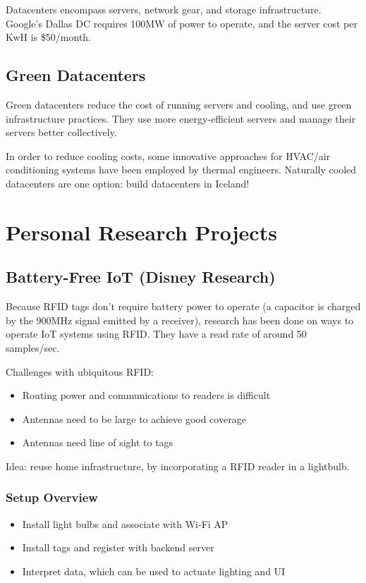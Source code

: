 \documentclass[twoside]{article}
\begin{document}
Datacenters encompass servers, network gear, and storage infrastructure. Google's Dallas DC requires 100MW of power to operate, and the server cost per KwH is \$50/month.

\subsection{Green Datacenters}
Green datacenters reduce the cost of running servers and cooling, and use green infrastructure practices. They use more energy-efficient servers and manage their servers better collectively. 

In order to reduce cooling costs, some innovative approaches for HVAC/air conditioning systems have been employed by thermal engineers. Naturally cooled datacenters are one option: build datacenters in Iceland!

\section{Personal Research Projects}

\subsection{Battery-Free IoT (Disney Research)}
Because RFID tags don't require battery power to operate (a capacitor is charged by the 900MHz signal emitted by a receiver), research has been done on ways to operate IoT systems using RFID. They have a read rate of around 50 samples/sec.

Challenges with ubiquitous RFID:
\begin{itemize}
  \item Routing power and communications to readers is difficult
  \item Antennas need to be large to achieve good coverage
  \item Antennas need line of sight to tags
\end{itemize}

Idea: reuse home infrastructure, by incorporating a RFID reader in a lightbulb.

\subsubsection{Setup Overview}
\begin{itemize}
  \item Install light bulbs and associate with Wi-Fi AP
  \item Install tags and register with backend server
  \item Interpret data, which can be used to actuate lighting and UI
\end{itemize}
\end{document}
